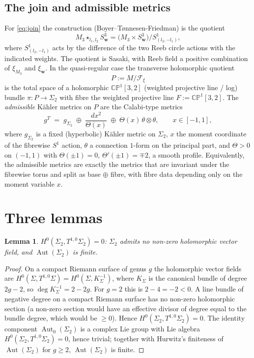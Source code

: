 \documentclass{amsart}
\newtheorem{lemma}{Lemma}
\theoremstyle{definition}
\DeclareMathOperator{\Aut}{Aut}
\begin{document}
\subsection{The join and admissible metrics}
For \eqref{eq:join} the construction (Boyer--Tønnesen-Friedman) is the quotient
\[
  M_3\star_{l_1,l_2}S^3_{\mathbf w}
  =\bigl(M_3\times S^3_{\mathbf w}\bigr)/S^1_{(l_2,-l_1)},
\]
where $S^1_{(l_2,-l_1)}$ acts by the difference of the two Reeb circle actions
with the indicated weights. The quotient is Sasaki, with Reeb field a positive
combination of $\xi_{M_3}$ and $\xi_{\mathbf w}$. In the quasi-regular case the
transverse holomorphic quotient
\[
  P:=M/\mathcal F_\xi
\]
is the total space of a holomorphic $\mathbb{CP}^1[3,2]$ (weighted projective
line / log) bundle $\pi\colon P\to\Sigma_2$ with fibre the weighted projective
line $F:=\mathbb{CP}^1[3,2]$. The \emph{admissible} K\"ahler metrics on $P$ are
the Calabi-type metrics
\begin{equation}\label{eq:admissible}
  g^T \;=\; g_{\Sigma_2} \;\oplus\; \frac{d x^2}{\Theta(x)} \;\oplus\;
  \Theta(x)\,\theta\otimes\theta,\qquad x\in[-1,1],
\end{equation}
where $g_{\Sigma_2}$ is a fixed (hyperbolic) K\"ahler metric on $\Sigma_2$, $x$
the moment coordinate of the fibrewise $S^1$ action, $\theta$ a connection
$1$-form on the principal part, and $\Theta>0$ on $(-1,1)$ with
$\Theta(\pm1)=0$, $\Theta'(\pm1)=\mp2$, a smooth profile. Equivalently, the
admissible metrics are exactly the metrics that are invariant under the
fibrewise torus and split as base $\oplus$ fibre, with fibre data depending only
on the moment variable $x$.

\section{Three lemmas}

\begin{lemma}\label{lem:rigidbase}
$H^0(\Sigma_2,T^{1,0}\Sigma_2)=0$: $\Sigma_2$ admits no non-zero holomorphic
vector field, and $\Aut(\Sigma_2)$ is finite.
\end{lemma}

\begin{proof}
On a compact Riemann surface of genus $g$ the holomorphic vector fields are
$H^0(\Sigma,T^{1,0}\Sigma)=H^0(\Sigma,K_\Sigma^{-1})$, where $K_\Sigma$ is the
canonical bundle of degree $2g-2$, so $\deg K_\Sigma^{-1}=2-2g$. For $g=2$ this
is $2-4=-2<0$. A line bundle of negative degree on a compact Riemann surface
has no non-zero holomorphic section (a non-zero section would have an effective
divisor of degree equal to the bundle degree, which would be $\ge 0$). Hence
$H^0(\Sigma_2,T^{1,0}\Sigma_2)=0$. The identity component
$\Aut_0(\Sigma_2)$ is a complex Lie group with Lie algebra
$H^0(\Sigma_2,T^{1,0}\Sigma_2)=0$, hence trivial; together with Hurwitz's
finiteness of $\Aut(\Sigma_2)$ for $g\ge2$, $\Aut(\Sigma_2)$ is finite.
\end{proof}
\end{document}
